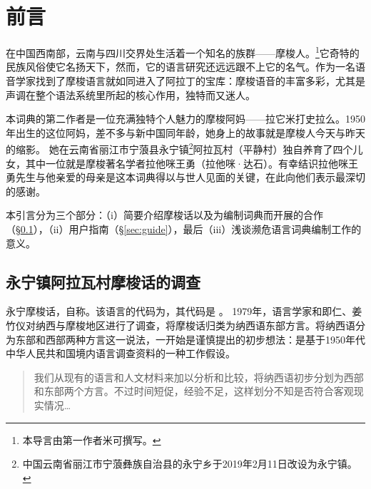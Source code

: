 \languecmncn

\chapter*{前言}


在中国西南部，云南与四川交界处生活着一个知名的族群——摩梭人。\footnote{本导言由第一作者米可撰写。}它奇特的民族风俗使它名扬天下，然而，它的语言研究还远远跟不上它的名气。作为一名语音学家找到了摩梭语言就如同进入了阿拉丁的宝库：摩梭语音的丰富多彩，尤其是声调在整个语法系统里所起的核心作用，独特而又迷人。

本词典的第二作者是一位充满独特个人魅力的摩梭阿妈——拉它米打史拉么。1950年出生的这位阿妈，差不多与新中国同年龄，她身上的故事就是摩梭人今天与昨天的缩影。
她在云南省丽江市宁蒗县永宁镇\footnote{中国云南省丽江市宁蒗彝族自治县的永宁乡于2019年2月11日改设为永宁镇。}阿拉瓦村（平静村）独自养育了四个儿女，其中一位就是摩梭著名学者拉他咪王勇（拉他咪·达石）。有幸结识拉他咪王勇先生与他亲爱的母亲是这本词典得以与世人见面的关键，在此向他们表示最深切的感谢。

本引言分为三个部分：（i）简要介绍摩梭话以及为编制词典而开展的合作（§\ref{sec:lang}），（ii）用户指南（§\ref{sec:guide}），最后（iii）浅谈濒危语言词典编制工作的意义。

\section{永宁镇阿拉瓦村摩梭话的调查}
\label{sec:lang}

永宁摩梭话，自称。该语言的代码为\parencite{lewisetal2016}，其代码是 \parencite{Nordhoff2012}。
1979年，语言学家和即仁、姜竹仪对纳西与摩梭地区进行了调查，将摩梭话归类为纳西语东部方言\parencite[4, 104--116]{heetal1985}。将{纳西语}分为东部和西部两种方言这一说法，一开始是谨慎提出的初步想法：是基于1950年代中华人民共和国境内语言调查资料的一种工作假设。

\begin{quotation}
我们从现有的语言和人文材料来加以分析和比较，将纳西语初步分划为西部和东部两个{方言}。不过时间短促，经验不足，这样划分不知是否符合客观现实情况{\dots}\parencite[120]{heetal1988}
\end{quotation}


